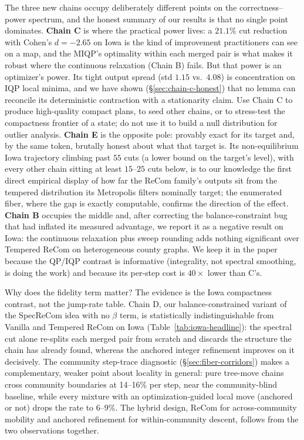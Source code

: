 \documentclass[11pt]{article}
\begin{document}
The three new chains occupy deliberately different points on the
correctness--power spectrum, and the honest summary of our results is
that no single point dominates. \textbf{Chain C} is where the
practical power lives: a $21.1\%$ cut reduction with Cohen's
$d = -2.65$ on Iowa is the kind of improvement practitioners can see
on a map, and the MIQP's optimality within each merged pair is what
makes it robust where the continuous relaxation (Chain B) fails. But
that power is an optimizer's power. Its tight output spread
(std $1.15$ vs.\ $4.08$) is concentration on IQP local minima, and we
have shown (\S\ref{sec:chain-c-honest}) that no lemma can reconcile
its deterministic contraction with a stationarity claim. Use Chain C
to produce high-quality compact plans, to seed other chains, or to
stress-test the compactness frontier of a state; do not use it to
build a null distribution for outlier analysis. \textbf{Chain E} is the
opposite pole: provably exact for its target and, by the same token,
brutally honest about what that target is. Its non-equilibrium Iowa
trajectory climbing past $55$ cuts (a lower bound on the target's
level), with every other chain sitting at least $15$--$25$ cuts
below, is to our knowledge the first direct empirical display of how
far the ReCom family's outputs sit from the tempered distribution its
Metropolis filters nominally target; the enumerated fiber, where the
gap is exactly computable, confirms the direction of the effect. \textbf{Chain
B} occupies the middle and, after correcting the balance-constraint
bug that had inflated its measured advantage, we report it as a
negative result on Iowa: the continuous relaxation plus sweep
rounding adds nothing significant over Tempered ReCom on
heterogeneous county graphs. We keep it in the paper because the
QP/IQP contrast is informative (integrality, not spectral
smoothing, is doing the work) and because its per-step cost is
$40\times$ lower than C's.

Why does the fidelity term matter? The evidence is the Iowa
compactness contrast, not the jump-rate table. Chain D, our
balance-constrained variant of the SpecReCom idea with no $\beta$
term, is statistically indistinguishable from Vanilla and Tempered
ReCom on Iowa (Table~\ref{tab:iowa-headline}): the spectral cut alone
re-splits each merged pair from scratch and discards the structure the
chain has already found, whereas the anchored integer refinement
improves on it decisively. The community step-trace diagnostic
(\S\ref{sec:fiber-corridors}) makes a complementary, weaker point
about locality in general: pure tree-move chains cross community
boundaries at 14--16\% per step, near the community-blind baseline,
while every mixture with an optimization-guided local move (anchored
or not) drops the rate to 6--9\%. The hybrid design, ReCom for
across-community mobility and anchored refinement for
within-community descent, follows from the two observations
together.
\end{document}
